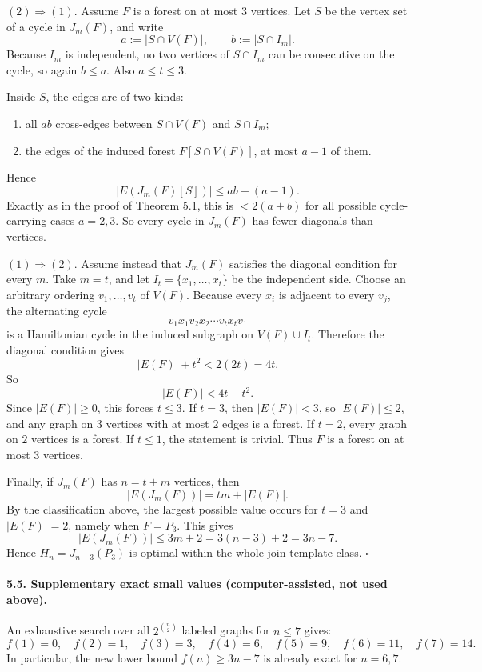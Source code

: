 \smallskip
\noindent
$(2)\Rightarrow(1)$.
Assume $F$ is a forest on at most $3$ vertices. Let $S$ be the vertex set of a cycle in $J_m(F)$, and write
\[
a:=|S\cap V(F)|,\qquad b:=|S\cap I_m|.
\]
Because $I_m$ is independent, no two vertices of $S\cap I_m$ can be consecutive on the cycle, so again $b\le a$. Also $a\le t\le 3$.

Inside $S$, the edges are of two kinds:

\begin{enumerate}
\item all $ab$ cross-edges between $S\cap V(F)$ and $S\cap I_m$;
\item the edges of the induced forest $F[S\cap V(F)]$, at most $a-1$ of them.
\end{enumerate}

Hence
\[
|E(J_m(F)[S])|\le ab+(a-1).
\]
Exactly as in the proof of Theorem 5.1, this is $<2(a+b)$ for all possible cycle-carrying cases $a=2,3$.
So every cycle in $J_m(F)$ has fewer diagonals than vertices.

\smallskip
\noindent
$(1)\Rightarrow(2)$.
Assume instead that $J_m(F)$ satisfies the diagonal condition for every $m$.
Take $m=t$, and let $I_t=\{x_1,\dots,x_t\}$ be the independent side.
Choose an arbitrary ordering $v_1,\dots,v_t$ of $V(F)$. Because every $x_i$ is adjacent to every $v_j$, the alternating cycle
\[
v_1x_1v_2x_2\cdots v_tx_tv_1
\]
is a Hamiltonian cycle in the induced subgraph on $V(F)\cup I_t$.
Therefore the diagonal condition gives
\[
|E(F)|+t^2<2(2t)=4t.
\]
So
\[
|E(F)|<4t-t^2.
\]
Since $|E(F)|\ge 0$, this forces $t\le 3$.
If $t=3$, then $|E(F)|<3$, so $|E(F)|\le 2$, and any graph on $3$ vertices with at most $2$ edges is a forest.
If $t=2$, every graph on $2$ vertices is a forest. If $t\le 1$, the statement is trivial.
Thus $F$ is a forest on at most $3$ vertices.

Finally, if $J_m(F)$ has $n=t+m$ vertices, then
\[
|E(J_m(F))|=tm+|E(F)|.
\]
By the classification above, the largest possible value occurs for $t=3$ and $|E(F)|=2$, namely when $F=P_3$. This gives
\[
|E(J_m(F))|\le 3m+2=3(n-3)+2=3n-7.
\]
Hence $H_n=J_{n-3}(P_3)$ is optimal within the whole join-template class.
\hfill$\square$

\paragraph{5.5. Supplementary exact small values (computer-assisted, not used above).}
An exhaustive search over all $2^{\binom{n}{2}}$ labeled graphs for $n\le 7$ gives:
\[
f(1)=0,\quad f(2)=1,\quad f(3)=3,\quad f(4)=6,\quad f(5)=9,\quad f(6)=11,\quad f(7)=14.
\]
In particular, the new lower bound $f(n)\ge 3n-7$ is already exact for $n=6,7$.

